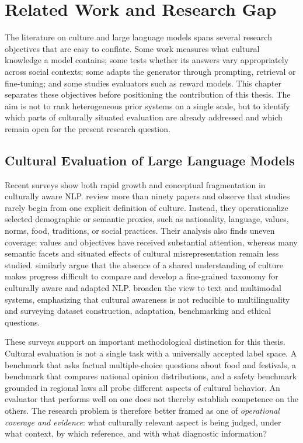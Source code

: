\chapter{Related Work and Research Gap}
\label{ch:related}

The literature on culture and large language models spans several research objectives that are easy to conflate. Some work measures what cultural knowledge a model contains; some tests whether its answers vary appropriately across social contexts; some adapts the generator through prompting, retrieval or fine-tuning; and some studies evaluators such as reward models. This chapter separates these objectives before positioning the contribution of this thesis. The aim is not to rank heterogeneous prior systems on a single scale, but to identify which parts of culturally situated evaluation are already addressed and which remain open for the present research question.

\section{Cultural Evaluation of Large Language Models}

Recent surveys show both rapid growth and conceptual fragmentation in culturally aware NLP. \textcite{adilazuarda2024culture} review more than ninety papers and observe that studies rarely begin from one explicit definition of culture. Instead, they operationalize selected demographic or semantic proxies, such as nationality, language, values, norms, food, traditions, or social practices. Their analysis also finds uneven coverage: values and objectives have received substantial attention, whereas many semantic facets and situated effects of cultural misrepresentation remain less studied. \textcite{liu2025culturallyaware} similarly argue that the absence of a shared understanding of culture makes progress difficult to compare and develop a fine-grained taxonomy for culturally aware and adapted NLP. \textcite{pawar2025culturalawareness} broaden the view to text and multimodal systems, emphasizing that cultural awareness is not reducible to multilinguality and surveying dataset construction, adaptation, benchmarking and ethical questions.

These surveys support an important methodological distinction for this thesis. Cultural evaluation is not a single task with a universally accepted label space. A benchmark that asks factual multiple-choice questions about food and festivals, a benchmark that compares national opinion distributions, and a safety benchmark grounded in regional laws all probe different aspects of cultural behavior. An evaluator that performs well on one does not thereby establish competence on the others. The research problem is therefore better framed as one of \emph{operational coverage and evidence}: what culturally relevant aspect is being judged, under what context, by which reference, and with what diagnostic information?

